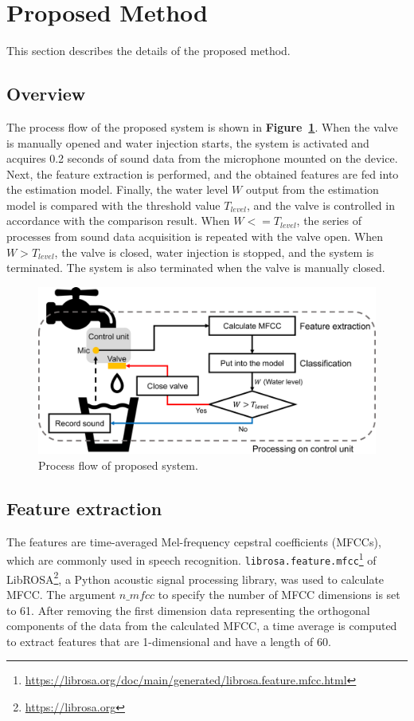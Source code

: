 \documentclass[manuscript,screen,review]{acmart}
\newcommand\figref[1]{\textbf{Figure~\ref{fig:#1}}}
\begin{document}
\section{Proposed Method}
\label{sec:method}
This section describes the details of the proposed method.

\subsection{Overview}
The process flow of the proposed system is shown in \figref{method}. When the valve is manually opened and water injection starts, the system is activated and acquires 0.2 seconds of sound data from the microphone mounted on the device. Next, the feature extraction is performed, and the obtained features are fed into the estimation model. Finally, the water level $W$ output from the estimation model is compared with the threshold value $T_{level}$, and the valve is controlled in accordance with the comparison result. When $W<=T_{level}$, the series of processes from sound data acquisition is repeated with the valve open. When $W>T_{level}$, the valve is closed, water injection is stopped, and the system is terminated. The system is also terminated when the valve is manually closed.

\begin{figure}[!t]
  \centering
  \includegraphics[width=0.8\linewidth]{figures/method.eps}
  \caption{Process flow of proposed system.}
  \label{fig:method}
\end{figure}


\subsection{Feature extraction}
The features are time-averaged Mel-frequency cepstral coefficients (MFCCs), which are commonly used in speech recognition. \texttt{librosa.feature.mfcc}\footnote{\url{https://librosa.org/doc/main/generated/librosa.feature.mfcc.html}} of LibROSA\footnote{\url{https://librosa.org}}, a Python acoustic signal processing library, was used to calculate MFCC. The argument $n\_mfcc$ to specify the number of MFCC dimensions is set to 61. After removing the first dimension data representing the orthogonal components of the data from the calculated MFCC, a time average is computed to extract features that are 1-dimensional and have a length of 60.
\end{document}
